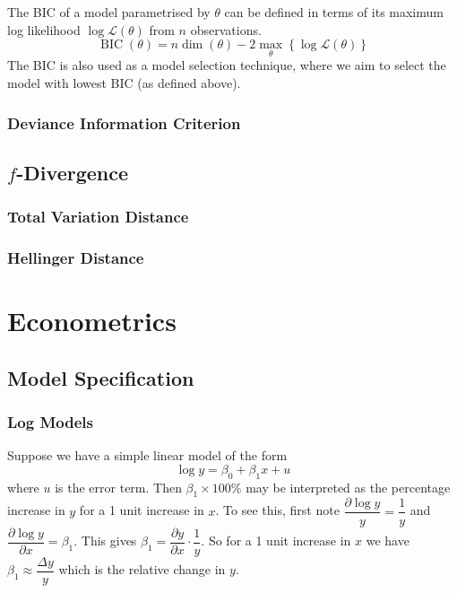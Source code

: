 \documentclass[11pt]{report} %
\begin{document}
The BIC of a model parametrised by $\theta$ can be defined in terms of its maximum log likelihood $\log\mathcal{L}\left(\theta\right)$ from $n$ observations.
\begin{equation}
\operatorname{BIC}\left(\theta\right) = n\dim\left(\theta\right) - 2\max_{\theta}\left\{\log\mathcal{L}\left(\theta\right)\right\}
\end{equation}
The BIC is also used as a model selection technique, where we aim to select the model with lowest BIC (as defined above).

\subsection{Deviance Information Criterion}


\section{$f$-Divergence}

\subsection{Total Variation Distance}

\subsection{Hellinger Distance}

\chapter{Econometrics}

\section{Model Specification}

\subsection{Log Models}

Suppose we have a simple linear model of the form
\begin{equation}
\log y = \beta_{0} + \beta_{1}x + u
\end{equation}
where $u$ is the error term. Then $\beta_{1}\times 100\%$ may be interpreted as the percentage increase in $y$ for a 1 unit increase in $x$. To see this, first note $\dfrac{\partial \log y}{y} = \dfrac{1}{y}$ and $\dfrac{\partial \log y}{\partial x} = \beta_{1}$. This gives $\beta_{1} = \dfrac{\partial y}{\partial x}\cdot\dfrac{1}{y}$. So for a 1 unit increase in $x$ we have $\beta_{1} \approx \dfrac{\Delta y}{y}$ which is the relative change in $y$.
\end{document}
